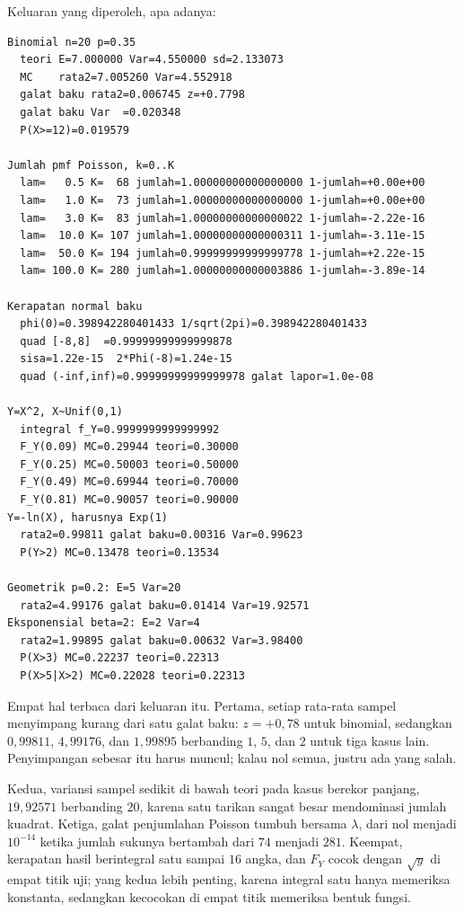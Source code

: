Keluaran yang diperoleh, apa adanya:

\begin{verbatim}
Binomial n=20 p=0.35
  teori E=7.000000 Var=4.550000 sd=2.133073
  MC    rata2=7.005260 Var=4.552918
  galat baku rata2=0.006745 z=+0.7798
  galat baku Var  =0.020348
  P(X>=12)=0.019579

Jumlah pmf Poisson, k=0..K
  lam=   0.5 K=  68 jumlah=1.00000000000000000 1-jumlah=+0.00e+00
  lam=   1.0 K=  73 jumlah=1.00000000000000000 1-jumlah=+0.00e+00
  lam=   3.0 K=  83 jumlah=1.00000000000000022 1-jumlah=-2.22e-16
  lam=  10.0 K= 107 jumlah=1.00000000000000311 1-jumlah=-3.11e-15
  lam=  50.0 K= 194 jumlah=0.99999999999999778 1-jumlah=+2.22e-15
  lam= 100.0 K= 280 jumlah=1.00000000000003886 1-jumlah=-3.89e-14

Kerapatan normal baku
  phi(0)=0.398942280401433 1/sqrt(2pi)=0.398942280401433
  quad [-8,8]  =0.99999999999999878
  sisa=1.22e-15  2*Phi(-8)=1.24e-15
  quad (-inf,inf)=0.99999999999999978 galat lapor=1.0e-08

Y=X^2, X~Unif(0,1)
  integral f_Y=0.9999999999999992
  F_Y(0.09) MC=0.29944 teori=0.30000
  F_Y(0.25) MC=0.50003 teori=0.50000
  F_Y(0.49) MC=0.69944 teori=0.70000
  F_Y(0.81) MC=0.90057 teori=0.90000
Y=-ln(X), harusnya Exp(1)
  rata2=0.99811 galat baku=0.00316 Var=0.99623
  P(Y>2) MC=0.13478 teori=0.13534

Geometrik p=0.2: E=5 Var=20
  rata2=4.99176 galat baku=0.01414 Var=19.92571
Eksponensial beta=2: E=2 Var=4
  rata2=1.99895 galat baku=0.00632 Var=3.98400
  P(X>3) MC=0.22237 teori=0.22313
  P(X>5|X>2) MC=0.22028 teori=0.22313
\end{verbatim}

Empat hal terbaca dari keluaran itu. Pertama, setiap rata-rata sampel menyimpang kurang
dari satu galat baku: $z=+0{,}78$ untuk binomial, sedangkan $0{,}99811$, $4{,}99176$,
dan $1{,}99895$ berbanding $1$, $5$, dan $2$ untuk tiga kasus lain. Penyimpangan
sebesar itu harus muncul; kalau nol semua, justru ada yang salah.

Kedua, variansi sampel sedikit di bawah teori pada kasus berekor panjang,
$19{,}92571$ berbanding $20$, karena satu tarikan sangat besar mendominasi jumlah
kuadrat. Ketiga, galat penjumlahan Poisson tumbuh bersama $\lambda$, dari nol menjadi
$10^{-14}$ ketika jumlah sukunya bertambah dari $74$ menjadi $281$. Keempat, kerapatan
hasil berintegral satu sampai $16$ angka, dan $F_Y$ cocok dengan $\sqrt y$ di empat
titik uji; yang kedua lebih penting, karena integral satu hanya memeriksa konstanta,
sedangkan kecocokan di empat titik memeriksa bentuk fungsi.

